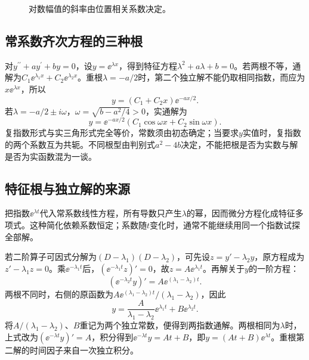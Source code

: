 \begin{solution}
\begin{figure}[H]\centering
{}
\caption{对数幅值的斜率由位置相关系数决定。}\label{fig:c2-e4-s}
\end{figure}
\end{solution}
\subsection{常系数齐次方程的三种根}
对$y^{\prime\prime}+ay^{\prime}+by=0$，设$y=\ee^{\lambda x}$，得到特征方程$\lambda^2+a\lambda+b=0$。若两根不等，通解为$C_1\ee^{\lambda_1x}+C_2\ee^{\lambda_2x}$。重根$\lambda=-a/2$时，第二个独立解不能仍取相同指数，而应为$x\ee^{\lambda x}$，所以
\[y=(C_1+C_2x)\ee^{-ax/2}.
\]
若$\lambda=-a/2\pm i\omega$，$\omega=\sqrt{b-a^2/4}>0$，实通解为
\[y=\ee^{-ax/2}(C_1\cos\omega x+C_2\sin\omega x).
\]
复指数形式与实三角形式完全等价，常数须由初态确定；当要求$y$实值时，复指数的两个系数互为共轭。不同根型由判别式$a^2-4b$决定，不能把根是否为实数与解是否为实函数混为一谈。

\subsection{特征根与独立解的来源}
把指数$\ee^{\lambda t}$代入常系数线性方程，所有导数只产生$\lambda$的幂，因而微分方程化成特征多项式。这种简化依赖系数恒定；系数随$t$变化时，通常不能继续用同一个指数试探全部解。

若二阶算子可因式分解为$(D-\lambda_1)(D-\lambda_2)$，可先设$z=y'-\lambda_2y$，原方程成为$z'-\lambda_1z=0$。乘$\ee^{-\lambda_1t}$后，$(\ee^{-\lambda_1t}z)'=0$，故$z=A\ee^{\lambda_1t}$。再解关于$y$的一阶方程：
\[(\ee^{-\lambda_2t}y)'=A\ee^{(\lambda_1-\lambda_2)t}.\]
两根不同时，右侧的原函数为$A\ee^{(\lambda_1-\lambda_2)t}/(\lambda_1-\lambda_2)$，因此
\[y=\frac{A}{\lambda_1-\lambda_2}\ee^{\lambda_1t}+B\ee^{\lambda_2t}.\]
将$A/(\lambda_1-\lambda_2)$、$B$重记为两个独立常数，便得到两指数通解。两根相同为$\lambda$时，上式改为$(\ee^{-\lambda t}y)'=A$，积分得到$\ee^{-\lambda t}y=At+B$，即$y=(At+B)\ee^{\lambda t}$。重根第二解的时间因子来自一次独立积分。

